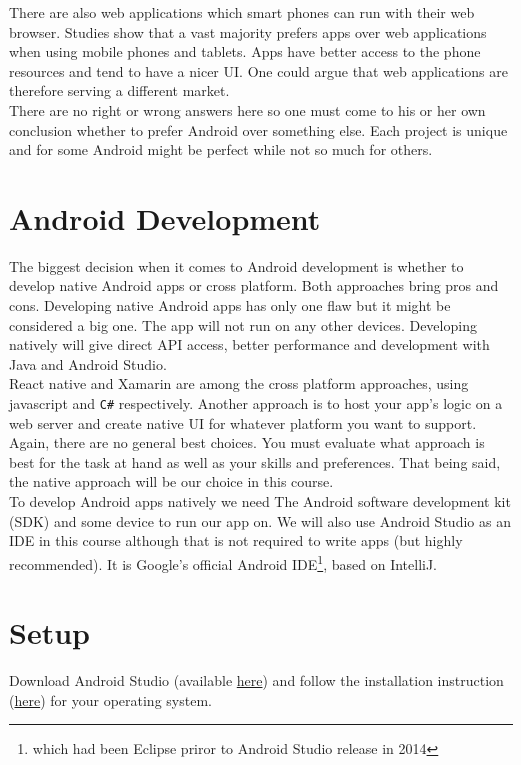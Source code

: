 There are also web applications which smart phones can run with their web browser. Studies show that a vast majority prefers apps over web applications when using mobile phones and tablets. Apps have better access to the phone resources and tend to have a nicer UI. One could argue that web applications are therefore serving a different market.\\

There are no right or wrong answers here so one must come to his or her own conclusion whether to prefer Android over something else. Each project is unique and for some Android might be perfect while not so much for others. 

\section{Android Development}
The biggest decision when it comes to Android development is whether to develop native Android apps or cross platform. Both approaches bring pros and cons. Developing native Android apps has only one flaw but it might be considered a big one. The app will not run on any other devices. Developing natively will give direct API access, better performance and development with Java and Android Studio.\\

React native and Xamarin are among the cross platform approaches, using javascript and \texttt{C\#} respectively. Another approach is to host your app's logic on a web server and create native UI for whatever platform you want to support. Again, there are no general best choices. You must evaluate what approach is best for the task at hand as well as your skills and preferences. That being said, the native approach will be our choice in this course.\\

To develop Android apps natively we need The Android software development kit (SDK) and some device to run our app on. We will also use Android Studio as an IDE in this course although that is not required to write apps (but highly recommended). It is Google's official Android IDE\footnote{which had been Eclipse priror to Android Studio release in 2014}, based on IntelliJ.

\section{Setup}
Download Android Studio (available \href{https://developer.android.com/studio/index.html}{here}) and follow the installation instruction (\href{https://developer.android.com/studio/install.html}{here}) for your operating system.


